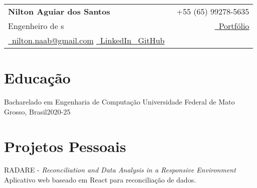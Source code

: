 

\newcommand{\name}{Nilton Aguiar dos Santos} %
\newcommand{\course}{Engenharia de Computação} %
\newcommand{\phone}{+55 (65) 99278-5635} %
\newcommand{\emaila}{nilton.naab@gmail.com} %
\newcommand{\github}{https://github.com/notNilton} %
\newcommand{\linkedin}{https://www.linkedin.com/in/notnilton/} %
\newcommand{\portifolio}{https://github.com/notNilton} %



\selectfont

{
\begin{tabularx}{\linewidth}{L r} \\
    \textbf{\Large \name} & {\raisebox{0.0\height}{\footnotesize \faPhone}\ \phone}
    \\
    {Engenheiro de s}
    &
    \href{\portifolio}{\raisebox{0.0\height}{\footnotesize \faGlobe}\ {Portfólio}}
    \\
    \href{mailto:\emaila} {\raisebox{0.0\height}{\footnotesize \faEnvelope}\ {\emaila}}
    \href{\linkedin}{\raisebox{0.0\height}{\footnotesize \faLinkedin}\ {LinkedIn} }
    \href{\github}{\raisebox{0.0\height}{\footnotesize \faGithub}\ {GitHub} }
\end{tabularx}
}

\section{\textbf{Educação}}
    \resumeSubHeadingListStart
    \resumeSubheading
    {Bacharelado em Engenharia de Computação}{}
    {Universidade Federal de Mato Grosso, Brasil}{2020-25}
    \resumeSubHeadingListEnd
\vspace{-5.5mm}

\section{\textbf{Projetos Pessoais}}
\resumeSubHeadingListStart
    \resumeProject
      { RADARE - \textit{Reconciliation and Data Analysis in a Responsive Environment}}
      {Aplicativo web baseado em React para reconciliação de dados.}
      {}

